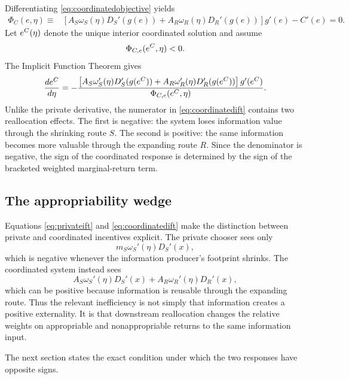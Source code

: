 Differentiating \eqref{eq:coordinatedobjective} yields
\begin{align}
    \Phi_C(e,\eta)
    \equiv{}&
    \left[A_S\omega_S(\eta)D_S'(g(e))
    +A_R\omega_R(\eta)D_R'(g(e))\right]g'(e)
    -C'(e)=0.
    \label{eq:coordinatedfoc}
\end{align}
Let $e^{C}(\eta)$ denote the unique interior coordinated solution and assume
\begin{equation}
    \Phi_{C,e}(e^{C},\eta)<0.
    \label{eq:coordinatedsoc}
\end{equation}
The Implicit Function Theorem gives
\begin{equation}
    \frac{de^{C}}{d\eta}
    =-
    \frac{
    \left[A_S\omega_S'(\eta)D_S'(g(e^{C}))
    +A_R\omega_R'(\eta)D_R'(g(e^{C}))\right]g'(e^{C})
    }
    {\Phi_{C,e}(e^{C},\eta)}.
    \label{eq:coordinatedift}
\end{equation}
Unlike the private derivative, the numerator in \eqref{eq:coordinatedift} contains two reallocation effects. The first is negative: the system loses information value through the shrinking route $S$. The second is positive: the same information becomes more valuable through the expanding route $R$. Since the denominator is negative, the sign of the coordinated response is determined by the sign of the bracketed weighted marginal-return term.

\subsection{The appropriability wedge}

Equations \eqref{eq:privateift} and \eqref{eq:coordinatedift} make the distinction between private and coordinated incentives explicit. The private chooser sees only
\[
    m_S\omega_S'(\eta)D_S'(x),
\]
which is negative whenever the information producer's footprint shrinks. The coordinated system instead sees
\[
    A_S\omega_S'(\eta)D_S'(x)
    +A_R\omega_R'(\eta)D_R'(x),
\]
which can be positive because information is reusable through the expanding route. Thus the relevant inefficiency is not simply that information creates a positive externality. It is that downstream reallocation changes the relative weights on appropriable and nonappropriable returns to the same information input.

The next section states the exact condition under which the two responses have opposite signs.
